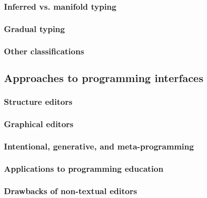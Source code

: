 \subsubsection{Inferred vs. manifold typing}
\label{sec:inferred_vs_manifold}

\subsubsection{Gradual typing}
\label{sec:gradual}

\subsubsection{Other classifications}
\label{sec:other_types}

\subsection{Approaches to programming interfaces}
\label{sec:prog_intf}

\subsubsection{Structure editors}
\label{sec:structure_editors}

\subsubsection{Graphical editors}
\label{sec:graphical_editors}

\subsubsection{Intentional, generative, and meta-programming}
\label{sec:intentional_programming}

\subsubsection{Applications to programming education}
\label{sec:programming_education}

\subsubsection{Drawbacks of non-textual editors}
\label{sec:textual_benefits}

